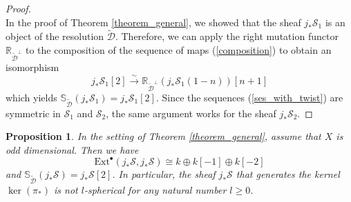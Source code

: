 \documentclass[a4paper, twoside, 11pt]{amsart}
\newtheorem{proposition}[theorem]{Proposition}
\theoremstyle{definition}
\theoremstyle{remark}
\numberwithin{equation}{theorem}
\begin{document}
\begin{proof}
\begin{equation*}
	\end{equation*}
	In the proof of Theorem \ref{theorem_general}, we showed that the sheaf  $j_*\mathcal{S}_1$ is an object of the resolution $\widetilde{\mathcal{D}}$. Therefore, we can apply the right mutation functor $\mathbb{R}_{\widetilde{\mathcal{D}}^\perp}$ to the composition of the sequence of maps (\ref{composition}) to obtain an isomorphism 
	\begin{equation*}
		j_*\mathcal{S}_1[2] \overset{\sim}{\longrightarrow} \mathbb{R}_{\widetilde{\mathcal{D}}^\perp}(j_*\mathcal{S}_1(1-n))[n+1]
	\end{equation*}
	which yields  $\mathbb{S}_{\widetilde{\mathcal{D}}}(j_*\mathcal{S}_1) =j_*\mathcal{S}_1[2]$. Since the sequences (\ref{ses_with_twist}) are symmetric in $\mathcal{S}_1$ and $\mathcal{S}_2$, the same argument works for the sheaf $j_*\mathcal{S}_2$. 
	\end{proof}
 \begin{proposition}
     In the setting of Theorem \ref{theorem_general}, assume that $X$ is odd dimensional. Then we have 
     \begin{equation*}
         \mathrm{Ext}^{\bullet}(j_*\mathcal{S}, j_*\mathcal{S}) \cong k \oplus k[-1] \oplus k[-2]
     \end{equation*}
     and $\mathbb{S}_{\widetilde{\mathcal{D}}}(j_*\mathcal{S}) = j_*\mathcal{S}[2]$. In particular, the sheaf $j_*\mathcal{S}$ that generates the kernel $\ker(\pi_*)$ is not $l$-spherical for any natural number $l \geq 0$.
 \end{proposition}
\end{document}
